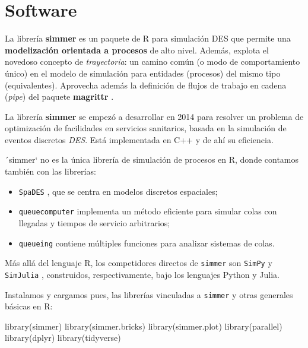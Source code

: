\documentclass[
]{book}
\newenvironment{Shaded}{\begin{snugshade}}{\end{snugshade}}
\newcommand{\FunctionTok}[1]{\textcolor[rgb]{0.00,0.00,0.00}{#1}}
\newcommand{\NormalTok}[1]{#1}
\providecommand{\tightlist}{%
  \setlength{\itemsep}{0pt}\setlength{\parskip}{0pt}}
\theoremstyle{definition}
\theoremstyle{definition}
\theoremstyle{definition}
\theoremstyle{definition}
\theoremstyle{remark}
\begin{document}
\hypertarget{software-1}{%
\section{Software}\label{software-1}}

La librería \textbf{simmer} \citep{R-simmer} es un paquete de R para simulación DES que permite una \textbf{modelización orientada a procesos} de alto nivel. Además, explota el novedoso concepto de \emph{trayectoria}: un camino común (o modo de comportamiento único) en el modelo de simulación para entidades (procesos) del mismo tipo (equivalentes). Aprovecha además la definición de flujos de trabajo en cadena (\emph{pipe}) del paquete \textbf{magrittr} \citep{R-magrittr}.

La librería \textbf{simmer} se empezó a desarrollar en 2014 para resolver un problema de optimización de facilidades en servicios sanitarios, basada en la simulación de eventos discretos \emph{DES}. Está implementada en C++ y de ahí su eficiencia.

´simmer` no es la única librería de simulación de procesos en R, donde contamos también con las librerías:

\begin{itemize}
\tightlist
\item
  \texttt{SpaDES} \citep{spades}, que se centra en modelos discretos espaciales;
\item
  \texttt{queuecomputer} \citep{R-queuecomputer} implementa un método eficiente para simular colas con llegadas y tiempos de servicio arbitrarios;
\item
  \texttt{queueing} \citep{R-queueing} contiene múltiples funciones para analizar sistemas de colas.
\end{itemize}

Más allá del lenguaje R, los competidores directos de \texttt{simmer} son \texttt{SimPy} \citep{simpy} y \texttt{SimJulia} \citep{simjulia}, construidos, respectivamente, bajo los lenguajes Python y Julia.

Instalamos y cargamos pues, las librerías vinculadas a \texttt{simmer} y otras generales básicas en R:

\begin{Shaded}
\begin{Highlighting}[]
\FunctionTok{library}\NormalTok{(simmer)}
\FunctionTok{library}\NormalTok{(simmer.bricks)}
\FunctionTok{library}\NormalTok{(simmer.plot)}
\FunctionTok{library}\NormalTok{(parallel)}
\FunctionTok{library}\NormalTok{(dplyr)}
\FunctionTok{library}\NormalTok{(tidyverse)}
\end{Highlighting}
\end{Shaded}
\end{document}
